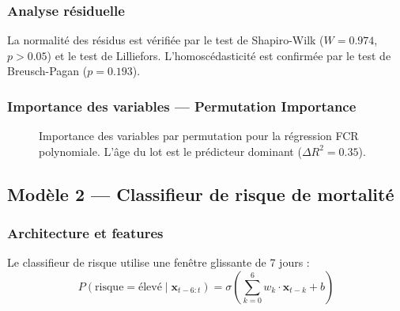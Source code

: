 \subsubsection{Analyse résiduelle}

La normalité des résidus est vérifiée par le test de Shapiro-Wilk
($W = 0.974$, $p > 0.05$) et le test de Lilliefors.
L'homoscédasticité est confirmée par le test de Breusch-Pagan ($p = 0.193$).

\subsubsection{Importance des variables --- Permutation Importance}

\begin{figure}[H]
\centering
{}
\caption{Importance des variables par permutation pour la régression FCR polynomiale.
L'âge du lot est le prédicteur dominant ($\Delta R^2 = 0.35$).}
\label{fig:fcr_importance}
\end{figure}

\subsection{Modèle 2 --- Classifieur de risque de mortalité}

\subsubsection{Architecture et features}

Le classifieur de risque utilise une fenêtre glissante de 7 jours :
\begin{equation}
P(\text{risque} = \text{élevé} \mid \mathbf{x}_{t-6:t}) =
\sigma\left(\sum_{k=0}^{6} w_k \cdot \mathbf{x}_{t-k} + b\right)
\label{eq:mortalite}
\end{equation}


